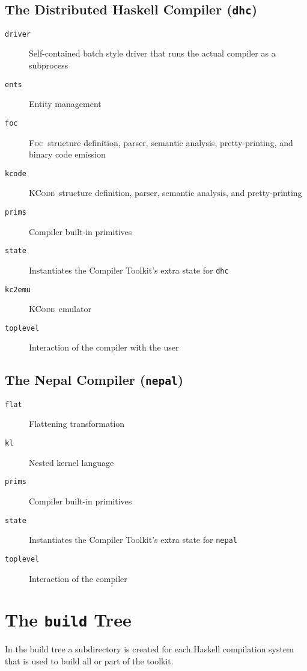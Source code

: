 \documentclass{report}
\newcommand{\FOC}{\textsc{Foc}}
\newcommand{\KCode}{\textsc{KCode}}
\newcommand{\code}[1]{\texttt{#1}}
\begin{document}
\subsection{The Distributed Haskell Compiler (\code{dhc})}

\begin{description}
\item[\code{driver}] Self-contained batch style driver that runs the actual
  compiler as a subprocess
\item[\code{ents}] Entity management
\item[\code{foc}] \FOC\ structure definition, parser, semantic analysis,
  pretty-printing, and binary code emission
\item[\code{kcode}] \KCode\ structure definition, parser, semantic analysis,
  and pretty-printing
\item[\code{prims}] Compiler built-in primitives
\item[\code{state}] Instantiates the Compiler Toolkit's extra state for
  \code{dhc} 
\item[\code{kc2emu}] \KCode\ emulator
\item[\code{toplevel}] Interaction of the compiler with the user
\end{description}

\subsection{The Nepal Compiler (\code{nepal})}

\begin{description}
\item[\code{flat}] Flattening transformation
\item[\code{kl}] Nested kernel language
\item[\code{prims}] Compiler built-in primitives
\item[\code{state}] Instantiates the Compiler Toolkit's extra state for
  \code{nepal} 
\item[\code{toplevel}] Interaction of the compiler
\end{description}


\section{The \code{build} Tree}

In the build tree a subdirectory is created for each Haskell compilation
system that is used to build all or part of the toolkit.
\end{document}
